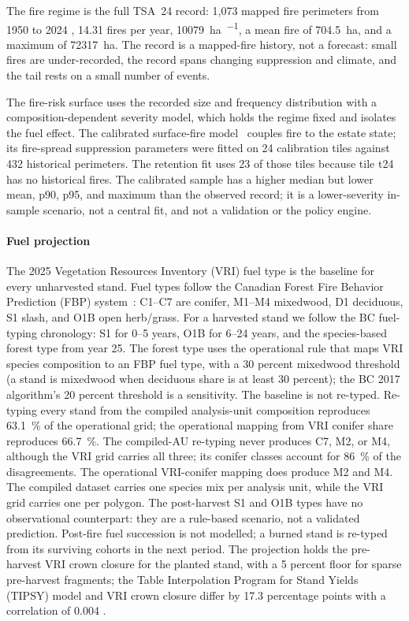 The fire regime is the full TSA~24 record: 1,073 mapped fire perimeters from 1950 to 2024
\citep{bc_wildfire_perimeters_2026},
\num{14.31} fires per year, \SI{10079}{\hectare\per\year}, a mean fire of \SI{704.5}{\hectare},
and a maximum of \SI{72317}{\hectare}. The record is a mapped-fire history, not a forecast: small
fires are under-recorded, the record spans changing suppression and climate, and the tail rests on
a small number of events.

The fire-risk surface uses the recorded size and frequency distribution with a
composition-dependent severity model, which holds the regime fixed and isolates the fuel effect. The
calibrated surface-fire model~\citep{ubc_fresh_fire_calibration_2026} couples fire to the estate
state; its fire-spread suppression parameters were fitted on 24 calibration tiles against 432
historical perimeters. The retention fit uses 23 of those tiles because tile t24 has no historical
fires. The calibrated sample has a higher median but lower mean, p90, p95, and maximum than the
observed record; it is a lower-severity in-sample scenario, not a central fit, and not a validation
or the policy engine.

\paragraph{Fuel projection} The 2025 Vegetation Resources Inventory (VRI) fuel type is the
baseline for every unharvested stand. Fuel types follow the Canadian Forest Fire Behavior Prediction
(FBP) system~\citep{forestry_canada_fbp_1992}: C1--C7 are conifer, M1--M4 mixedwood, D1 deciduous,
S1 slash, and O1B open herb/grass. For a harvested stand we follow the BC fuel-typing chronology: S1
for 0--5 years, O1B for 6--24 years, and the species-based forest type from year 25. The forest type
uses the operational rule that maps VRI species composition to an FBP fuel type, with a 30 percent
mixedwood threshold (a stand is mixedwood when deciduous share is at least 30 percent); the BC 2017
algorithm's 20 percent threshold is a sensitivity. The baseline is not
re-typed. Re-typing every stand from the compiled analysis-unit composition reproduces
\SI{63.1}{\percent} of the operational grid; the operational mapping from VRI conifer share
reproduces \SI{66.7}{\percent}. The compiled-AU re-typing never produces C7, M2, or M4, although the
VRI grid carries all three; its conifer classes account for \SI{86}{\percent} of the disagreements.
The operational VRI-conifer mapping does produce M2 and M4. The compiled dataset carries one species
mix per analysis unit, while the VRI grid carries one per polygon. The post-harvest S1 and O1B types have no observational counterpart: they are a rule-based scenario, not a validated prediction. Post-fire fuel succession is
not modelled; a burned stand is re-typed from its surviving cohorts in the next period. The
projection holds the pre-harvest VRI crown closure for the planted stand, with a 5 percent floor for
sparse pre-harvest fragments; the Table Interpolation Program for Stand Yields (TIPSY) model and VRI
crown closure differ by 17.3
percentage points with a correlation of 0.004
\citep{government_of_british_columbia_tipsy_2026}.

